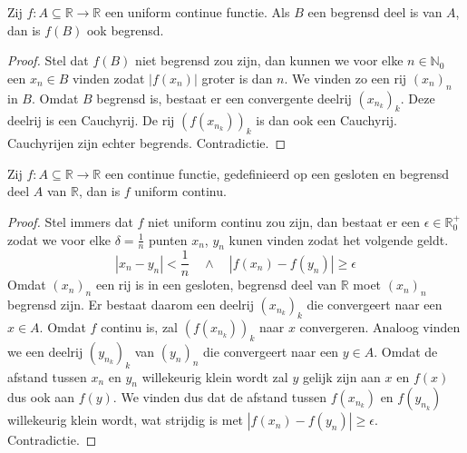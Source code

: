 \documentclass[main.tex]{subfiles}
\begin{document}
\begin{bpr}
  Zij $f: A \subseteq \mathbb{R} \rightarrow \mathbb{R}$ een uniform continue functie.
  Als $B$ een begrensd deel is van $A$, dan is $f(B)$ ook begrensd.

  \begin{proof}
    Stel dat $f(B)$ niet begrensd zou zijn, dan kunnen we voor elke $n\in \mathbb{N}_{0}$ een $x_{n}\in B$ vinden zodat $|f(x_{n})|$ groter is dan $n$.
    We vinden zo een rij $(x_{n})_{n}$ in $B$.
    Omdat $B$ begrensd is, bestaat er een convergente deelrij $(x_{n_{k}})_{k}$.
    Deze deelrij is een Cauchyrij.
    De rij $(f(x_{n_{k}}))_{k}$ is dan ook een Cauchyrij.
    Cauchyrijen zijn echter begrends. Contradictie.
  \end{proof}
\end{bpr}

\begin{bst}
  Zij $f: A \subseteq \mathbb{R} \rightarrow \mathbb{R}$ een continue functie, gedefinieerd op een gesloten en begrensd deel $A$ van $\mathbb{R}$, dan is $f$ uniform continu.

  \begin{proof}
    Stel immers dat $f$ niet uniform continu zou zijn, dan bestaat er een $\epsilon \in \mathbb{R}_{0}^{+}$ zodat we voor elke $\delta = \frac{1}{n}$ punten $x_{n}$, $y_{n}$ kunen vinden zodat het volgende geldt.
    \[ |x_{n}-y_{n}| < \frac{1}{n} \quad\wedge\quad |f(x_{n})-f(y_{n})| \ge \epsilon \]
    Omdat $(x_{n})_{n}$ een rij is in een gesloten, begrensd deel van $\mathbb{R}$ moet $(x_{n})_{n}$ begrensd zijn.
    Er bestaat daarom een deelrij $(x_{n_{k}})_{k}$ die convergeert naar een $x\in A$.
    Omdat $f$ continu is, zal $(f(x_{n_{k}}))_{k}$ naar $x$ convergeren.
    Analoog vinden we een deelrij $(y_{n_{k}})_{k}$ van $(y_{n})_{n}$ die convergeert naar een $y\in A$.
    Omdat de afstand tussen $x_{n}$ en $y_{n}$ willekeurig klein wordt zal $y$ gelijk zijn aan $x$ en $f(x)$ dus ook aan $f(y)$.
    We vinden dus dat de afstand tussen $f(x_{n_{k}})$ en $f(y_{n_{k}})$ willekeurig klein wordt, wat strijdig is met $|f(x_{n})-f(y_{n})| \ge \epsilon$.
    Contradictie.
  \end{proof}
\end{bst}
\end{document}
